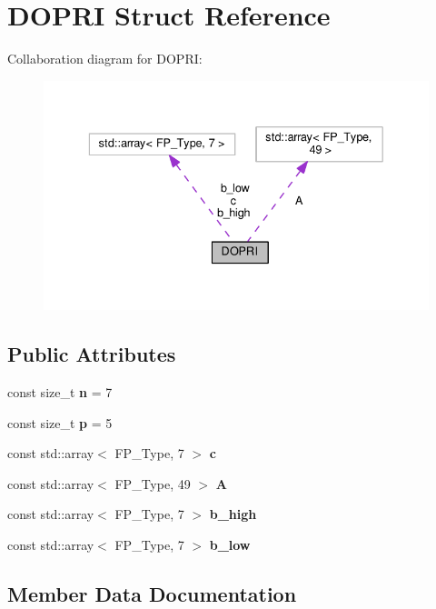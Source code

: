 \hypertarget{structDOPRI}{}\section{D\+O\+P\+RI Struct Reference}
\label{structDOPRI}


Collaboration diagram for D\+O\+P\+RI\+:\nopagebreak
\begin{figure}[H]
\begin{center}
\leavevmode
\includegraphics[width=336pt]{structDOPRI__coll__graph}
\end{center}
\end{figure}
\subsection*{Public Attributes}
\begin{DoxyCompactItemize}
\item 
\mbox{\label{structDOPRI_a3520af988d456d6f669ba92fae81cea2}} 
const size\+\_\+t {\bfseries n} = 7
\item 
\mbox{\label{structDOPRI_ac37416bef484da5a81ee78fc86f86edd}} 
const size\+\_\+t {\bfseries p} = 5
\item 
const std\+::array$<$ F\+P\+\_\+\+Type, 7 $>$ {\bfseries c}
\item 
const std\+::array$<$ F\+P\+\_\+\+Type, 49 $>$ {\bfseries A}
\item 
const std\+::array$<$ F\+P\+\_\+\+Type, 7 $>$ {\bfseries b\+\_\+high}
\item 
const std\+::array$<$ F\+P\+\_\+\+Type, 7 $>$ {\bfseries b\+\_\+low}
\end{DoxyCompactItemize}


\subsection{Member Data Documentation}
\mbox{\label{structDOPRI_a65a11509e008348c328fa217fc7538a2}} 
